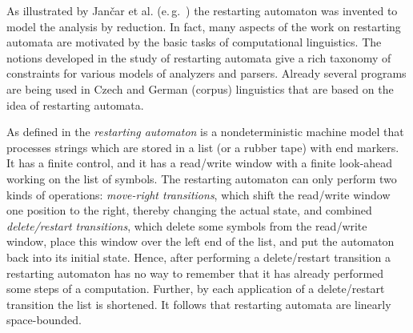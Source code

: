 As illustrated by Jan{\v c}ar et al. (e.\,g.\ \citep{JMPV99}) the restarting automaton was invented to model the analysis by reduction. In fact, many aspects of the work on restarting automata are motivated by the basic tasks of computational linguistics. The notions developed in the study of restarting automata give a rich taxonomy of constraints for various models of analyzers and parsers. Already several programs are being used in Czech and German (corpus) linguistics that are based on the idea of restarting automata.

As defined in \citep{JMPV95} the \emph{restarting automaton} is a nondeterministic machine model that processes strings which are stored in a list (or a rubber tape) with end markers. It has a finite control, and it has a read/write window with a finite look-ahead working on the list of symbols. The restarting automaton can only perform two kinds of operations:  \emph{move-right transitions}, which shift the read/write window one position to the right, thereby changing the actual state, and combined \emph{delete/restart transitions}, which delete some symbols from the read/write window, place this window over the left end of the list, and put the automaton back into its initial state. Hence, after performing a delete/restart transition a restarting automaton has no way to remember that it has already performed some steps of a computation. Further, by each application of a delete/restart transition the list is shortened. It follows that restarting automata are linearly space-bounded.

